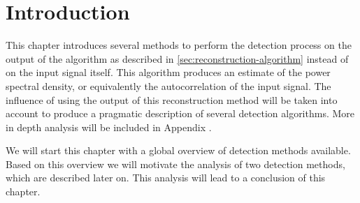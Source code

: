 \documentclass[a4paper, openany, oneside]{memoir}
\begin{document}
\section{Introduction}
This chapter introduces several methods to perform the detection process on the output of the algorithm as described in \cref{sec:reconstruction-algorithm} instead of on the input signal itself. This algorithm produces an estimate of the power spectral density, or equivalently the autocorrelation of the input signal. The influence of using the output of this reconstruction method will be taken into account to produce a pragmatic description of several detection algorithms.  More in depth analysis will be included in Appendix .

We will start this chapter with a global overview of detection methods available. Based on this overview we will motivate the analysis of two detection methods, which are described later on. This analysis will lead to a conclusion of this chapter.
\end{document}

